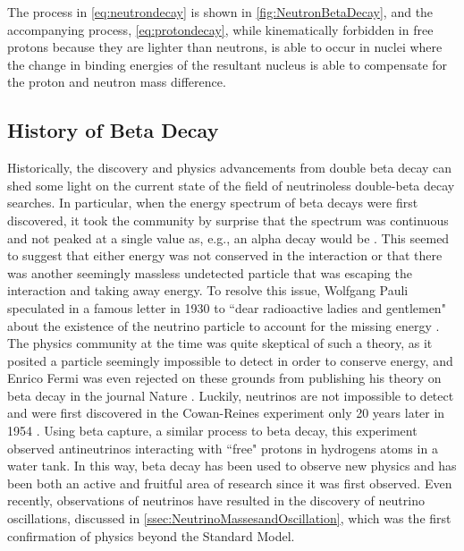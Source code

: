 The process in \autoref{eq:neutrondecay} is shown in \autoref{fig:NeutronBetaDecay}, and the accompanying process, \autoref{eq:protondecay}, while kinematically forbidden in free protons because they are lighter than neutrons, is able to occur in nuclei where the change in binding energies of the resultant nucleus is able to compensate for the proton and neutron mass difference.

\subsection{History of Beta Decay}
Historically, the discovery and physics advancements from double beta decay can shed some light on the current state of the field of neutrinoless double-beta decay searches. In particular, when the energy spectrum of beta decays were first discovered, it took the community by surprise that the spectrum was continuous and not peaked at a single value as, e.g., an alpha decay would be \cite{o.vonbayero.hahnl.meitner}. This seemed to suggest that either energy was not conserved in the interaction or that there was another seemingly massless undetected particle that was escaping the interaction and taking away energy. To resolve this issue, Wolfgang Pauli speculated in a famous letter in 1930 to ``dear radioactive ladies and gentlemen" about the existence of the neutrino particle to account for the missing energy \cite{pauli_1930}. The physics community at the time was quite skeptical of such a theory, as it posited a particle seemingly impossible to detect in order to conserve energy, and Enrico Fermi was even rejected on these grounds from publishing his theory on beta decay in the journal Nature \cite{fermi_1934}. Luckily, neutrinos are not impossible to detect and were first discovered in the Cowan-Reines experiment only 20 years later in 1954 \cite{PhysRev.92.830}. Using beta capture, a similar process to beta decay, this experiment observed antineutrinos interacting with ``free" protons in hydrogens atoms in a water tank. In this way, beta decay has been used to observe new physics and has been both an active and fruitful area of research since it was first observed. Even recently, observations of neutrinos have resulted in the discovery of neutrino oscillations, discussed in \autoref{ssec:NeutrinoMassesandOscillation}, which was the first confirmation of physics beyond the Standard Model.

